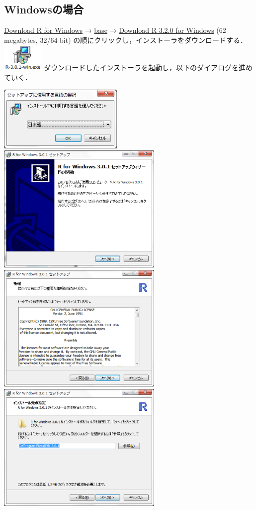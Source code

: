 \subsection{Windowsの場合}
\underline{Download R for Windows} → \underline{base} → \underline{Download R 3.2.0 for Windows} (62 megabytes, 32/64 bit) の順にクリックし，インストーラをダウンロードする．
\includegraphics[width=2cm]{img/windows/win001.eps} ダウンロードしたインストーラを起動し，以下のダイアログを進めていく．

\includegraphics[width=6cm]{img/windows/win002.eps}\hspace{0.8em} \includegraphics[width=8cm]{img/windows/win003.eps}\\

\includegraphics[width=8cm]{img/windows/win004.eps}\hspace{0.8em} \includegraphics[width=8cm]{img/windows/win005.eps}\\

